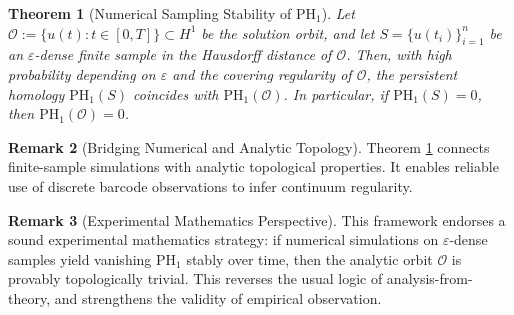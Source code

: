 \documentclass[11pt]{article}
\newtheorem{theorem}{Theorem}[section]
\theoremstyle{definition}
\newtheorem{remark}[theorem]{Remark}
\begin{document}
\begin{theorem}[Numerical Sampling Stability of $\mathrm{PH}_1$]
\label{thm:niyogi_smale_weinberger}
Let $\mathcal{O} := \{u(t): t \in [0,T]\} \subset H^1$ be the solution orbit, and let $S = \{u(t_i)\}_{i=1}^n$ be an $\varepsilon$-dense finite sample in the Hausdorff distance of $\mathcal{O}$. Then, with high probability depending on $\varepsilon$ and the covering regularity of $\mathcal{O}$, the persistent homology $\mathrm{PH}_1(S)$ coincides with $\mathrm{PH}_1(\mathcal{O})$. In particular, if $\mathrm{PH}_1(S) = 0$, then $\mathrm{PH}_1(\mathcal{O}) = 0$.
\end{theorem}

\begin{remark}[Bridging Numerical and Analytic Topology]
Theorem \ref{thm:niyogi_smale_weinberger} connects finite-sample simulations with analytic topological properties. It enables reliable use of discrete barcode observations to infer continuum regularity.
\end{remark}

\begin{remark}[Experimental Mathematics Perspective]
This framework endorses a sound experimental mathematics strategy: if numerical simulations on $\varepsilon$-dense samples yield vanishing $\mathrm{PH}_1$ stably over time, then the analytic orbit $\mathcal{O}$ is provably topologically trivial. This reverses the usual logic of analysis-from-theory, and strengthens the validity of empirical observation.
\end{remark}
\end{document}
